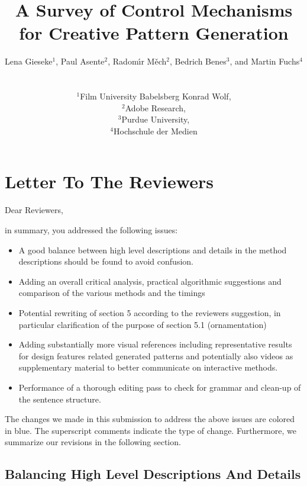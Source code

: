 \documentclass{egpubl}
\title[A Survey of Control Mechanisms for Creative Pattern Generation]%
      {A Survey of Control Mechanisms for Creative Pattern Generation}
\author[L. Gieseke, P. Asente, R. Mech, B. Benes, M. Fuchs]
{\parbox{\textwidth}{\centering Lena Gieseke$^{1}$, Paul Asente$^{2}$, Radom\'{\i}r M\v{e}ch$^{2}$, Bedrich Benes$^{3}$, and Martin Fuchs$^{4}$}
        \\
{\parbox{\textwidth}{\centering $^1$Film University Babelsberg Konrad Wolf,\\
         $^2$Adobe Research,\\
         $^3$Purdue University,\\
         $^4$Hochschule der Medien
       }
}
}
\begin{document}
\onecolumn

\maketitle



\section*{Letter To The Reviewers}

Dear Reviewers,

\noindent in summary, you addressed the following issues:

\begin{itemize}
    \item A good balance between high level descriptions and details in the method descriptions should be found to avoid confusion.
    \item Adding an overall critical analysis, practical algorithmic suggestions and comparison of the various methods and the timings
    \item Potential rewriting of section 5 according to the reviewers suggestion, in particular clarification of the purpose of section 5.1 (ornamentation)
    \item Adding substantially more visual references including representative results for design features related generated patterns and potentially also videos as supplementary material to better communicate on interactive methods.
    \item Performance of a thorough editing pass to check for grammar and clean-up of the sentence structure.
\end{itemize}

The changes we made in this submission to address the above issues are colored in blue. The superscript comments indicate the type of change. Furthermore, we summarize our revisions in the following section.

\subsection*{Balancing High Level Descriptions And Details}
\end{document}
